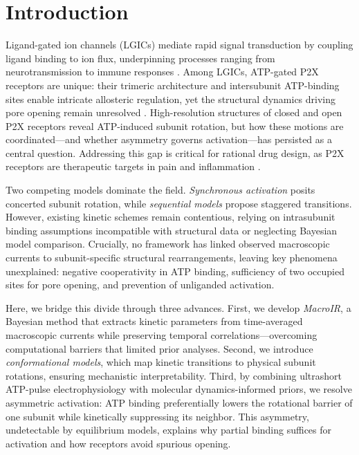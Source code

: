 \documentclass[pdflatex,sn-mathphys-num]{sn-jnl}%
\theoremstyle{thmstyleone}%
\theoremstyle{thmstyletwo}%
\theoremstyle{thmstylethree}%
\begin{document}
\section{Introduction}
\label{sec1}

Ligand-gated ion channels (LGICs) mediate rapid signal transduction by coupling ligand binding to ion flux, underpinning processes ranging from neurotransmission to immune responses \cite{p2x_cuerpo_humano,p2x_drugs}. Among LGICs, ATP-gated P2X receptors are unique: their trimeric architecture and intersubunit ATP-binding sites enable intricate allosteric regulation, yet the structural dynamics driving pore opening remain unresolved \cite{cerrada_p2x,abierta_p2x}. High-resolution structures of closed and open P2X receptors \cite{estructura_p2x1} reveal ATP-induced subunit rotation, but how these motions are coordinated—and whether asymmetry governs activation—has persisted as a central question. Addressing this gap is critical for rational drug design, as P2X receptors are therapeutic targets in pain and inflammation \cite{therapeutic,p2x7_pharmacology}.

Two competing models dominate the field. \textit{Synchronous activation} posits concerted subunit rotation, while \textit{sequential models} propose staggered transitions. However, existing kinetic schemes remain contentious, relying on intrasubunit binding assumptions incompatible with structural data \cite{Moffatt_hume} or neglecting Bayesian model comparison. Crucially, no framework has linked observed macroscopic currents to subunit-specific structural rearrangements, leaving key phenomena unexplained: negative cooperativity in ATP binding, sufficiency of two occupied sites for pore opening, and prevention of unliganded activation.

Here, we bridge this divide through three advances. First, we develop \textit{MacroIR}, a Bayesian method that extracts kinetic parameters from time-averaged macroscopic currents while preserving temporal correlations—overcoming computational barriers that limited prior analyses. Second, we introduce \textit{conformational models}, which map kinetic transitions to physical subunit rotations, ensuring mechanistic interpretability. Third, by combining ultrashort ATP-pulse electrophysiology \cite{Moffatt_hume} with molecular dynamics-informed priors, we resolve asymmetric activation: ATP binding preferentially lowers the rotational barrier of one subunit while kinetically suppressing its neighbor. This asymmetry, undetectable by equilibrium models, explains why partial binding suffices for activation and how receptors avoid spurious opening.
\end{document}
